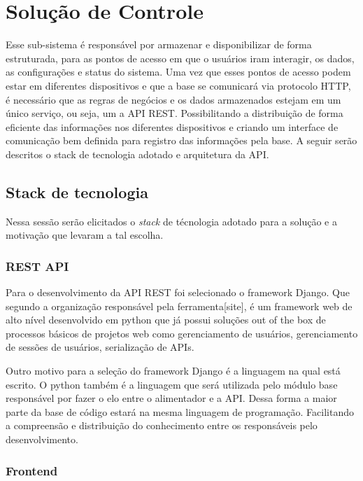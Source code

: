\section{Solução de Controle}

Esse sub-sistema é responsável por armazenar e disponibilizar de forma estruturada, para as pontos de acesso em que o usuários iram interagir, os dados, as configurações e status do sistema. Uma vez que esses pontos de acesso podem estar em diferentes dispositivos e que a base se comunicará via protocolo HTTP, é necessário que as regras de negócios e os dados armazenados estejam em um único serviço, ou seja, um a API REST. Possibilitando a distribuição de forma eficiente das informações nos diferentes dispositivos e criando um interface de comunicação bem definida para registro das informações pela base. A seguir serão descritos o stack de tecnologia adotado e arquitetura da API.

\subsection{Stack de tecnologia}

Nessa sessão serão elicitados o \textit{stack} de técnologia adotado para a solução e a motivação que levaram a tal escolha.

\subsubsection{REST API}

Para o desenvolvimento da API REST foi selecionado o framework Django. Que segundo a organização responsável pela ferramenta[site], é um framework web de alto nível desenvolvido em python que já possui soluções out of the box de processos básicos de projetos web como gerenciamento de usuários, gerenciamento de sessões de usuários, serialização de APIs.

Outro motivo para a seleção do framework Django é a linguagem na qual está escrito. O python também é a linguagem que será utilizada pelo módulo base responsável por fazer o elo entre o alimentador e a API. Dessa forma a maior parte da base de código estará na mesma linguagem de programação. Facilitando a compreensão e distribuição do conhecimento entre os responsáveis pelo desenvolvimento.

\subsubsection{Frontend}

